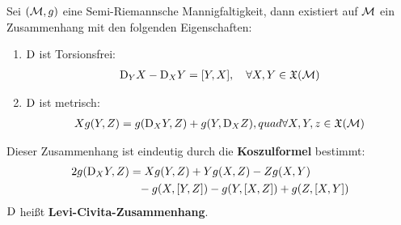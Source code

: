 \begin{satz}
\label{satz:koszulformel}
Sei $(\mathcal{M}, g)$ eine Semi-Riemannsche Mannigfaltigkeit, dann existiert auf $\mathcal{M}$ ein Zusammenhang mit den folgenden Eigenschaften:
\begin{enumerate}
\item $\mathrm{D}$ ist Torsionsfrei:
\begin{align}
\covd_Y X - \covd_X Y = \comm{Y}{X}, \quad \forall X, Y \in \mathfrak{X}(\mfk)
\end{align}
\item $\mathrm{D}$ ist metrisch:
\begin{align}
X g(Y, Z) = g(\mathrm{D}_X Y, Z) + g(Y, \mathrm{D}_X Z), quad \forall X,Y,z \in \mathfrak{X}(\mathcal{M})
\end{align}
\end{enumerate}
Dieser Zusammenhang ist eindeutig durch die \textbf{Koszulformel} bestimmt:
\begin{align}
2 g (\covd_X Y, Z) &= X g(Y, Z) + Y g(X, Z) - Z g(X, Y)\\
&\phantom{=} - g(X, \comm{Y}{Z}) - g(Y, \comm{X}{Z}) + g(Z, \comm{X}{Y})
\end{align}
$\mathrm{D}$ heißt \textbf{Levi-Civita-Zusammenhang}.
\end{satz}

